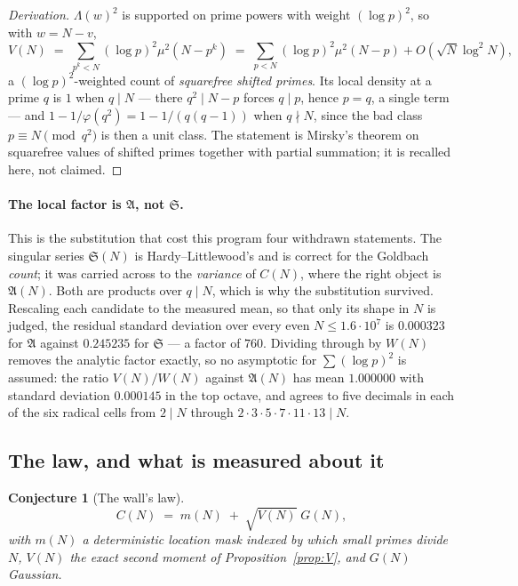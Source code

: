 \documentclass[11pt,a4paper]{article}
\theoremstyle{plain}
\newtheorem{conjecture}[theorem]{Conjecture}
\theoremstyle{definition}
\begin{document}
\begin{proof}[Derivation]
$\Lambda(w)^2$ is supported on prime powers with weight $(\log p)^2$,
so with $w=N-v$,
\[
  V(N) \;=\; \sum_{p^k<N}(\log p)^2\mu^2(N-p^k)
        \;=\; \sum_{p<N}(\log p)^2\mu^2(N-p) + O(\sqrt N\log^2 N),
\]
a $(\log p)^2$-weighted count of \emph{squarefree shifted primes}. Its
local density at a prime $q$ is $1$ when $q\mid N$ --- there
$q^2\mid N-p$ forces $q\mid p$, hence $p=q$, a single term --- and
$1-1/\varphi(q^2) = 1-1/(q(q-1))$ when $q\nmid N$, since the bad class
$p\equiv N \pmod{q^2}$ is then a unit class. The statement is Mirsky's
theorem on squarefree values of shifted primes \cite{Mir49} together
with partial summation; it is recalled here, not claimed.
\end{proof}

\paragraph{The local factor is $\mathfrak A$, not $\mathfrak S$.}
This is the substitution that cost this program four withdrawn
statements. The singular series $\mathfrak S(N)$ is Hardy--Littlewood's
and is correct for the Goldbach \emph{count}; it was carried across to
the \emph{variance} of $C(N)$, where the right object is
$\mathfrak A(N)$. Both are products over $q\mid N$, which is why the
substitution survived. Rescaling each candidate to the measured mean,
so that only its shape in $N$ is judged, the residual standard
deviation over every even $N\le 1.6\cdot10^7$ is $0.000323$ for
$\mathfrak A$ against $0.245235$ for $\mathfrak S$ --- a factor of
$760$. Dividing through by $W(N)$ removes the analytic factor exactly,
so no asymptotic for $\sum(\log p)^2$ is assumed: the ratio
$V(N)/W(N)$ against $\mathfrak A(N)$ has mean $1.000000$ with standard
deviation $0.000145$ in the top octave, and agrees to five decimals in
each of the six radical cells from $2\mid N$ through
$2\cdot3\cdot5\cdot7\cdot11\cdot13\mid N$.

\subsection{The law, and what is measured about it}

\begin{conjecture}[The wall's law]\label{conj:wall}
\[
  C(N) \;=\; m(N) \;+\; \sqrt{V(N)}\;G(N),
\]
with $m(N)$ a deterministic \emph{location mask} indexed by which small
primes divide $N$, $V(N)$ the exact second moment of
Proposition~\ref{prop:V}, and $G(N)$ Gaussian.
\end{conjecture}
\end{document}
